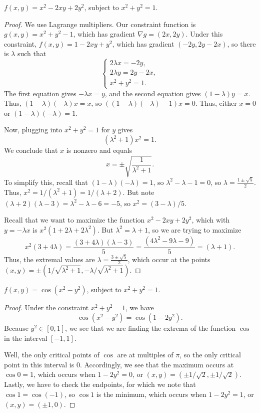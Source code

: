 \documentclass[openany]{book}
\begin{document}
\begin{prob}[15]
    \( f(x, y) = x^2 - 2xy + 2y^2 \), subject to \( x^2 + y^2 = 1 \).
\end{prob}
\begin{proof}
    We use Lagrange multipliers. Our constraint function is $g(x,y)=x^2+y^2-1$, which has gradient $\nabla g=(2x,2y)$. Under this constraint, $f(x,y)=1-2xy+y^2$, which has gradient $(-2y,2y-2x)$, so there is $\lambda$ such that
    \[\begin{cases}
        2\lambda x=-2y, \\
        2\lambda y=2y-2x, \\
        x^2+y^2=1.
    \end{cases}\]
    The first equation gives $-\lambda x=y$, and the second equation gives $(1-\lambda)y=x$. Thus, $(1-\lambda)(-\lambda)x=x$, so $((1-\lambda)(-\lambda)-1)x=0$. Thus, either $x=0$ or $(1-\lambda)(-\lambda)=1$.

    Now, plugging into $x^2+y^2=1$ for $y$ gives
    \[\left(\lambda^2+1\right)x^2=1.\]
    We conclude that $x$ is nonzero and equals
    \[x=\pm\sqrt{\frac1{\lambda^2+1}}.\]
    To simplify this, recall that $(1-\lambda)(-\lambda)=1$, so $\lambda^2-\lambda-1=0$, so $\lambda=\frac{1\pm\sqrt5}2$. Thus, $x^2=1/\left(\lambda^2+1\right)=1/(\lambda+2)$. But note $(\lambda+2)(\lambda-3)=\lambda^2-\lambda-6=-5$, so $x^2=(3-\lambda)/5$.

    Recall that we want to maximize the function $x^2-2xy+2y^2$, which with $y=-\lambda x$ is $x^2\left(1+2\lambda+2\lambda^2\right)$. But $\lambda^2=\lambda+1$, so we are trying to maximize
    \[x^2(3+4\lambda)=\frac{(3+4\lambda)(\lambda-3)}5=\frac{(4\lambda^2-9\lambda-9)}5=(\lambda+1).\]
    Thus, the extremal values are $\lambda=\frac{3\pm\sqrt5}2$, which occur at the points $(x,y)=\pm\left(1/\sqrt{\lambda^2+1},-\lambda/\sqrt{\lambda^2+1}\right)$.
\end{proof}

\begin{prob}[17]
    \( f(x, y) = \cos(x^2 - y^2) \), subject to \( x^2 + y^2 = 1 \).
\end{prob}
\begin{proof}
    Under the constraint $x^2+y^2=1$, we have
    \[\cos\left(x^2-y^2\right)=\cos\left(1-2y^2\right).\]
    Because $y^2\in[0,1]$, we see that we are finding the extrema of the function $\cos$ in the interval $[-1,1]$.
    
    Well, the only critical points of $\cos$ are at multiples of $\pi$, so the only critical point in this interval is $0$. Accordingly, we see that the maximum occurs at $\cos0=1$, which occurs when $1-2y^2=0$, or $(x,y)=(\pm1/\sqrt2,\pm1/\sqrt2)$. Lastly, we have to check the endpoints, for which we note that $\cos1=\cos(-1)$, so $\cos1$ is the minimum, which occurs when $1-2y^2=1$, or $(x,y)=(\pm1,0)$.
\end{proof}
\end{document}
